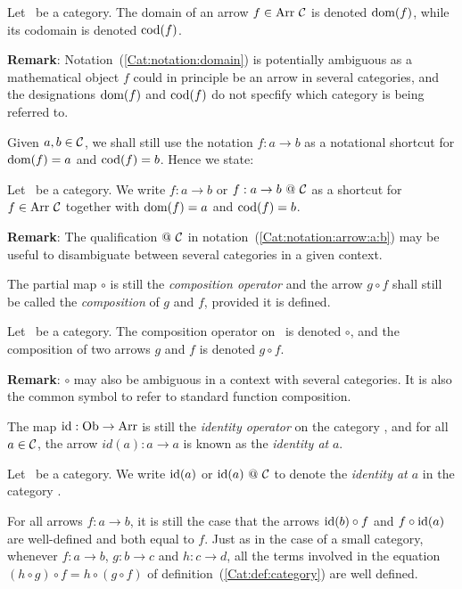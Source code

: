 \begin{notation}\label{Cat:notation:domain}
    Let \Cat\ be a category. The domain of an arrow $f\in\mbox{\rm Arr}\ \mbox{$\cal C$}$ is 
    denoted $\mbox{\rm dom}(f)$, while its codomain is denoted $\mbox{\rm cod}(f)$.
\end{notation}


\noindent
{\bf Remark}: Notation~(\ref{Cat:notation:domain}) is potentially ambiguous 
as a mathematical object $f$ could in principle be an arrow in several 
categories, and the designations $\mbox{\rm dom}(f)$ and $\mbox{\rm cod}(f)$ do not specfify 
which category is being referred to.

Given $a,b\in\mbox{$\cal C$}$, we shall still use the notation $f:a\to b$ as a
notational shortcut for $\mbox{\rm dom}(f)=a$ and $\mbox{\rm cod}(f)=b$. Hence we state:

\begin{notation}\label{Cat:notation:arrow:a:b}
    Let \Cat\ be a category. We write $f:a\to b$ or $f:a\to b\ @\ \mbox{$\cal C$}$ 
    as a shortcut for $f\in\mbox{\rm Arr}\ \mbox{$\cal C$}$ together with $\mbox{\rm dom}(f)=a$ and 
    $\mbox{\rm cod}(f)=b$.
\end{notation}
\noindent
{\bf Remark}: The qualification $@\ \mbox{$\cal C$}$ in 
notation~(\ref{Cat:notation:arrow:a:b}) may be useful to disambiguate
between several categories in a given context.

The partial map $\circ$ is still the {\em composition operator} and the 
arrow $g\circ f$ shall still be called the {\em composition} of $g$ and $f$, 
provided it is defined. 
\begin{notation}\label{Cat:notation:composition}
    Let \Cat\ be a category. The composition
    operator on \Cat\ is denoted $\circ$, and the composition of 
    two arrows $g$ and $f$ is denoted $g\circ f$.
\end{notation}

\noindent
{\bf Remark}: $\circ$ may also be ambiguous in a context with several 
categories. It is also the common symbol to refer to standard function
composition.

The map $\mbox{\rm id}:\mbox{\rm Ob}\to\mbox{\rm Arr}$ is still the {\em identity operator}
on the category \Cat, and for all $a\in\mbox{$\cal C$}$, the arrow $id(a):a\to a$ is 
known as the {\em identity at} $a$. 

\begin{notation}\label{Cat:notation:identity}
    Let \Cat\ be a category. We write $\mbox{\rm id}(a)$ or $\mbox{\rm id}(a)\ @\ \mbox{$\cal C$}$ 
    to denote the {\em identity at $a$} in the category \Cat.
\end{notation}

For all arrows $f:a\to b$, it is still
the case that the arrows $\mbox{\rm id}(b)\circ f$ and $f\circ\mbox{\rm id}(a)$ are well-defined
and both equal to $f$. Just as in the case of a small category, whenever 
$f:a\to b$, $g:b\to c$ and $h:c\to d$, all the terms involved in the 
equation $(h\circ g)\circ f=h\circ(g\circ f)$ of
definition~(\ref{Cat:def:category}) are well defined.


